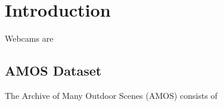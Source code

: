 \chapter{Introduction}
\label{cpt:intro}

Webcams are 

\section{AMOS Dataset}

The Archive of Many Outdoor Scenes (AMOS) consists of 


